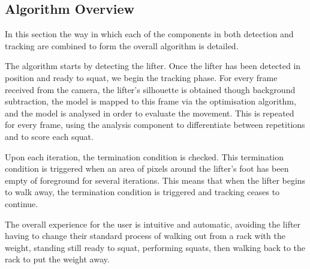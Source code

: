 \subsection{Algorithm Overview}
\label{sec:algorithm_overview}

In this section the way in which each of the components in both detection and tracking are combined to form the overall algorithm is detailed.

The algorithm starts by detecting the lifter. Once the lifter has been detected in position and ready to squat, we begin the tracking phase. For every frame received from the camera, the lifter's silhouette is obtained though background subtraction, the model is mapped to this frame via the optimisation algorithm, and the model is analysed in order to evaluate the movement. This is repeated for every frame, using the analysis component to differentiate between repetitions and to score each squat.

Upon each iteration, the termination condition is checked. This termination condition is triggered when an area of pixels around the lifter's foot has been empty of foreground for several iterations. This means that when the lifter begins to walk away, the termination condition is triggered and tracking ceases to continue.

The overall experience for the user is intuitive and automatic, avoiding the lifter having to change their standard process of walking out from a rack with the weight, standing still ready to squat, performing squats, then walking back to the rack to put the weight away.